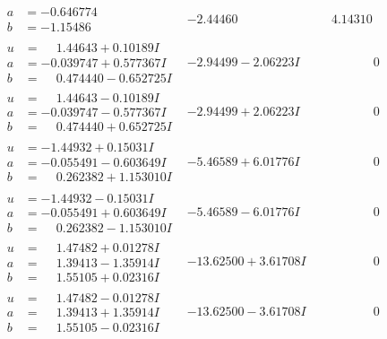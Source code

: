 \documentclass[1p]{elsarticle_modified}
\theoremstyle{definition}
\begin{document}
$$\begin{array}{c|c|c}
\begin{aligned}
a &= -0.646774\phantom{ +0.000000I} \\
b &= -1.15486\phantom{ +0.000000I}\end{aligned}
 & -2.44460\phantom{ +0.000000I} & \phantom{-}4.14310\phantom{ +0.000000I} \\ \hline\begin{aligned}
u &= \phantom{-}1.44643 + 0.10189 I \\
a &= -0.039747 + 0.577367 I \\
b &= \phantom{-}0.474440 - 0.652725 I\end{aligned}
 & -2.94499 - 2.06223 I & \phantom{-0.000000 } 0 \\ \hline\begin{aligned}
u &= \phantom{-}1.44643 - 0.10189 I \\
a &= -0.039747 - 0.577367 I \\
b &= \phantom{-}0.474440 + 0.652725 I\end{aligned}
 & -2.94499 + 2.06223 I & \phantom{-0.000000 } 0 \\ \hline\begin{aligned}
u &= -1.44932 + 0.15031 I \\
a &= -0.055491 - 0.603649 I \\
b &= \phantom{-}0.262382 + 1.153010 I\end{aligned}
 & -5.46589 + 6.01776 I & \phantom{-0.000000 } 0 \\ \hline\begin{aligned}
u &= -1.44932 - 0.15031 I \\
a &= -0.055491 + 0.603649 I \\
b &= \phantom{-}0.262382 - 1.153010 I\end{aligned}
 & -5.46589 - 6.01776 I & \phantom{-0.000000 } 0 \\ \hline\begin{aligned}
u &= \phantom{-}1.47482 + 0.01278 I \\
a &= \phantom{-}1.39413 - 1.35914 I \\
b &= \phantom{-}1.55105 + 0.02316 I\end{aligned}
 & -13.62500 + 3.61708 I & \phantom{-0.000000 } 0 \\ \hline\begin{aligned}
u &= \phantom{-}1.47482 - 0.01278 I \\
a &= \phantom{-}1.39413 + 1.35914 I \\
b &= \phantom{-}1.55105 - 0.02316 I\end{aligned}
 & -13.62500 - 3.61708 I & \phantom{-0.000000 } 0\\

\end{array}$$
\end{document}
